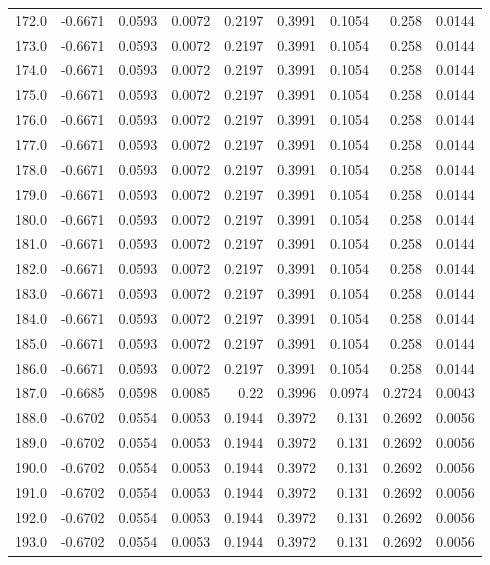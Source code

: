 \begin{longtable}{lrrrrrrrr}
172.0 & -0.6671 & 0.0593 & 0.0072 & 0.2197 & 0.3991 & 0.1054 & 0.258 & 0.0144 \\
173.0 & -0.6671 & 0.0593 & 0.0072 & 0.2197 & 0.3991 & 0.1054 & 0.258 & 0.0144 \\
174.0 & -0.6671 & 0.0593 & 0.0072 & 0.2197 & 0.3991 & 0.1054 & 0.258 & 0.0144 \\
175.0 & -0.6671 & 0.0593 & 0.0072 & 0.2197 & 0.3991 & 0.1054 & 0.258 & 0.0144 \\
176.0 & -0.6671 & 0.0593 & 0.0072 & 0.2197 & 0.3991 & 0.1054 & 0.258 & 0.0144 \\
177.0 & -0.6671 & 0.0593 & 0.0072 & 0.2197 & 0.3991 & 0.1054 & 0.258 & 0.0144 \\
178.0 & -0.6671 & 0.0593 & 0.0072 & 0.2197 & 0.3991 & 0.1054 & 0.258 & 0.0144 \\
179.0 & -0.6671 & 0.0593 & 0.0072 & 0.2197 & 0.3991 & 0.1054 & 0.258 & 0.0144 \\
180.0 & -0.6671 & 0.0593 & 0.0072 & 0.2197 & 0.3991 & 0.1054 & 0.258 & 0.0144 \\
181.0 & -0.6671 & 0.0593 & 0.0072 & 0.2197 & 0.3991 & 0.1054 & 0.258 & 0.0144 \\
182.0 & -0.6671 & 0.0593 & 0.0072 & 0.2197 & 0.3991 & 0.1054 & 0.258 & 0.0144 \\
183.0 & -0.6671 & 0.0593 & 0.0072 & 0.2197 & 0.3991 & 0.1054 & 0.258 & 0.0144 \\
184.0 & -0.6671 & 0.0593 & 0.0072 & 0.2197 & 0.3991 & 0.1054 & 0.258 & 0.0144 \\
185.0 & -0.6671 & 0.0593 & 0.0072 & 0.2197 & 0.3991 & 0.1054 & 0.258 & 0.0144 \\
186.0 & -0.6671 & 0.0593 & 0.0072 & 0.2197 & 0.3991 & 0.1054 & 0.258 & 0.0144 \\
187.0 & -0.6685 & 0.0598 & 0.0085 & 0.22 & 0.3996 & 0.0974 & 0.2724 & 0.0043 \\
188.0 & -0.6702 & 0.0554 & 0.0053 & 0.1944 & 0.3972 & 0.131 & 0.2692 & 0.0056 \\
189.0 & -0.6702 & 0.0554 & 0.0053 & 0.1944 & 0.3972 & 0.131 & 0.2692 & 0.0056 \\
190.0 & -0.6702 & 0.0554 & 0.0053 & 0.1944 & 0.3972 & 0.131 & 0.2692 & 0.0056 \\
191.0 & -0.6702 & 0.0554 & 0.0053 & 0.1944 & 0.3972 & 0.131 & 0.2692 & 0.0056 \\
192.0 & -0.6702 & 0.0554 & 0.0053 & 0.1944 & 0.3972 & 0.131 & 0.2692 & 0.0056 \\
193.0 & -0.6702 & 0.0554 & 0.0053 & 0.1944 & 0.3972 & 0.131 & 0.2692 & 0.0056 \\

\end{longtable}
